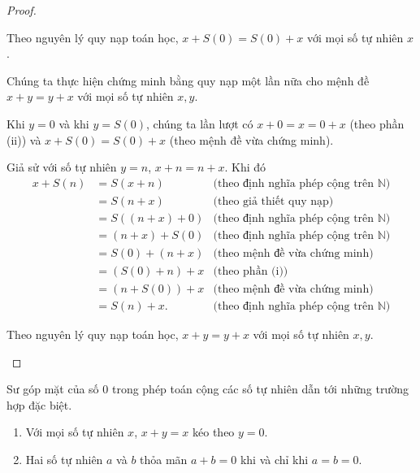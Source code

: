 \begin{proof}
\begin{enumerate}[label={(\roman*)}]
		      Theo nguyên lý quy nạp toán học, $x + S(0) = S(0) + x$ với mọi số tự nhiên $x$.

		      Chúng ta thực hiện chứng minh bằng quy nạp một lần nữa cho mệnh đề $x + y = y + x$ với mọi số tự nhiên $x, y$.

		      Khi $y = 0$ và khi $y = S(0)$, chúng ta lần lượt có $x + 0 = x = 0 + x$ (theo phần (ii)) và $x + S(0) = S(0) + x$ (theo mệnh đề vừa chứng minh).

		      Giả sử với số tự nhiên $y = n$, $x + n = n + x$. Khi đó
		      \begin{align*}
			      x + S(n) & = S(x + n)       & \text{(theo định nghĩa phép cộng trên $\mathbb{N}$)} \\
			               & = S(n + x)       & \text{(theo giả thiết quy nạp)}                      \\
			               & = S((n + x) + 0) & \text{(theo định nghĩa phép cộng trên $\mathbb{N}$)} \\
			               & = (n + x) + S(0) & \text{(theo định nghĩa phép cộng trên $\mathbb{N}$)} \\
			               & = S(0) + (n + x) & \text{(theo mệnh đề vừa chứng minh)}                 \\
			               & = (S(0) + n) + x & \text{(theo phần (i))}                               \\
			               & = (n + S(0)) + x & \text{(theo mệnh đề vừa chứng minh)}                 \\
			               & = S(n) + x.      & \text{(theo định nghĩa phép cộng trên $\mathbb{N}$)}
		      \end{align*}

		      Theo nguyên lý quy nạp toán học, $x + y = y + x$ với mọi số tự nhiên $x, y$.
	\end{enumerate}
\end{proof}

Sư góp mặt của số $0$ trong phép toán cộng các số tự nhiên dẫn tới những trường hợp  đặc biệt.
\begin{theorem}\label{theorem:addition-and-zero}
	\begin{enumerate}[label={(\roman*)}]
		\item Với mọi số tự nhiên $x$, $x + y = x$ kéo theo $y = 0$.
		\item Hai số tự nhiên $a$ và $b$ thỏa mãn $a + b = 0$ khi và chỉ khi $a = b = 0$.
	\end{enumerate}
\end{theorem}

